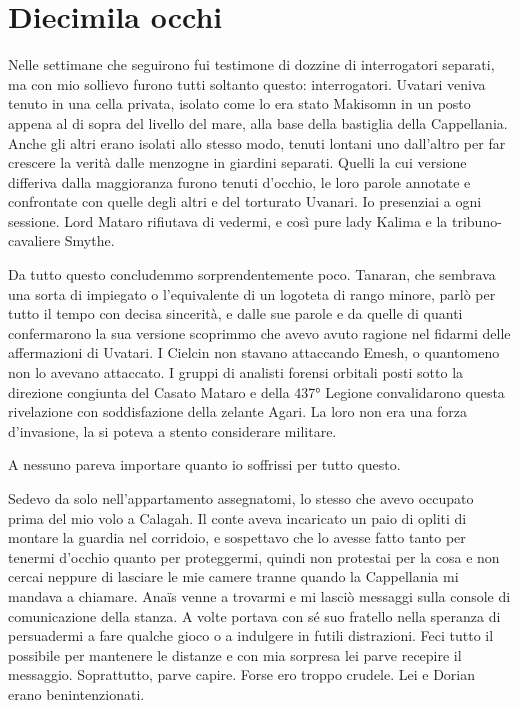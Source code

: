 \chapter{Diecimila occhi}

Nelle settimane che seguirono fui testimone di dozzine di interrogatori
separati, ma con mio sollievo furono tutti soltanto questo:
interrogatori. Uvatari veniva tenuto in una cella privata, isolato come
lo era stato Makisomn in un posto appena al di sopra del livello del
mare, alla base della bastiglia della Cappellania. Anche gli altri erano
isolati allo stesso modo, tenuti lontani uno dall'altro per far crescere
la verità dalle menzogne in giardini separati. Quelli la cui versione
differiva dalla maggioranza furono tenuti d'occhio, le loro parole
annotate e confrontate con quelle degli altri e del torturato Uvanari.
Io presenziai a ogni sessione. Lord Mataro rifiutava di vedermi, e così
pure lady Kalima e la tribuno-cavaliere Smythe.

Da tutto questo concludemmo sorprendentemente poco. Tanaran, che
sembrava una sorta di impiegato o l'equivalente di un logoteta di rango
minore, parlò per tutto il tempo con decisa sincerità, e dalle sue
parole e da quelle di quanti confermarono la sua versione scoprimmo che
avevo avuto ragione nel fidarmi delle affermazioni di Uvatari. I Cielcin
non stavano attaccando Emesh, o quantomeno non lo avevano attaccato. I
gruppi di analisti forensi orbitali posti sotto la direzione congiunta
del Casato Mataro e della 437° Legione convalidarono questa rivelazione
con soddisfazione della zelante Agari. La loro non era una forza
d'invasione, la si poteva a stento considerare militare.

A nessuno pareva importare quanto io soffrissi per tutto questo.

Sedevo da solo nell'appartamento assegnatomi, lo stesso che avevo
occupato prima del mio volo a Calagah. Il conte aveva {incaricato} un
paio di opliti di montare la guardia nel corridoio, e sospettavo che lo
avesse fatto tanto per tenermi d'occhio quanto per proteggermi, quindi
non protestai per la cosa e non cercai neppure di lasciare le mie camere
tranne quando la Cappellania mi mandava a chiamare. Anaïs venne a
trovarmi e mi lasciò messaggi sulla console di comunicazione della
stanza. A volte portava con sé suo fratello nella speranza di
persuadermi a fare qualche gioco o a indulgere in futili distrazioni.
Feci tutto il possibile per mantenere le distanze e con mia sorpresa lei
parve recepire il messaggio. Soprattutto, parve capire. Forse ero troppo
crudele. Lei e Dorian erano benintenzionati.

